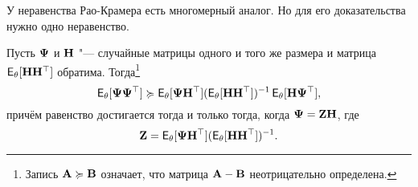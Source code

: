 У неравенства Рао-Крамера есть многомерный аналог. Но для его доказательства нужно одно неравенство.
\begin{theorem}
	Пусть $\mathbf{\Psi}$ и $\mathbf{H}$ "--- случайные матрицы одного и того же размера и матрица $\operatorname{\mathsf{E}}_{\theta}[\mathbf{H}\mathbf{H}^{\top}]$ обратима. Тогда\footnote{Запись $\mathbf{A} \succcurlyeq \mathbf{B}$ означает, что матрица $\mathbf{A} - \mathbf{B}$ неотрицательно определена.}
	\[
		\operatorname{\mathsf{E}}_{\theta}[\mathbf{\Psi}\mathbf{\Psi}^{\top}] \succcurlyeq \operatorname{\mathsf{E}}_{\theta}[\mathbf{\Psi}\mathbf{H}^{\top}](\operatorname{\mathsf{E}}_{\theta}[\mathbf{H}\mathbf{H}^{\top}])^{-1}\operatorname{\mathsf{E}}_{\theta}[\mathbf{H}\mathbf{\Psi}^{\top}],
	\]
	причём равенство достигается тогда и только тогда, когда $\mathbf{\Psi} = \mathbf{Z}\mathbf{H}$, где
	\[
		\mathbf{Z} = \operatorname{\mathsf{E}}_{\theta}[\mathbf{\Psi}\mathbf{H}^{\top}](\operatorname{\mathsf{E}}_{\theta}[\mathbf{H}\mathbf{H}^{\top}])^{-1}.
	\]
\end{theorem}
